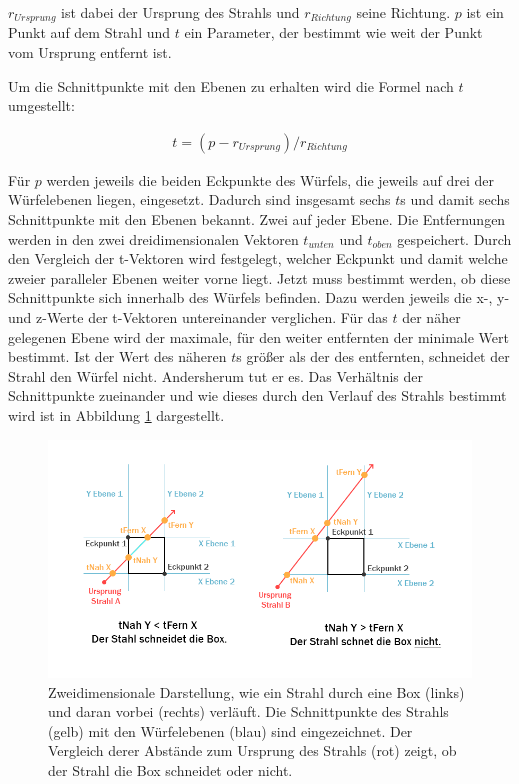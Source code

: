 $r_{Ursprung}$ ist dabei der Ursprung des Strahls und $r_{Richtung}$ seine Richtung. $p$ ist ein Punkt auf dem Strahl und $t$ ein Parameter, der bestimmt wie weit der Punkt vom Ursprung entfernt ist.

Um die Schnittpunkte mit den Ebenen zu erhalten wird die Formel nach $t$ umgestellt:

\begin{align}
t=(p-r_{Ursprung})/r_{Richtung}
\end{align}

Für $p$ werden jeweils die beiden Eckpunkte des Würfels, die jeweils auf drei der Würfelebenen liegen, eingesetzt.
Dadurch sind insgesamt sechs $t$s und damit sechs Schnittpunkte mit den Ebenen bekannt. Zwei auf jeder Ebene. Die Entfernungen werden in den zwei dreidimensionalen Vektoren $t_{unten}$ und $t_{oben}$ gespeichert. Durch den Vergleich der t-Vektoren wird festgelegt, welcher Eckpunkt und damit welche zweier paralleler Ebenen weiter vorne liegt. 
Jetzt muss bestimmt werden, ob diese Schnittpunkte sich innerhalb des Würfels befinden.
Dazu werden jeweils die x-, y- und z-Werte der t-Vektoren untereinander verglichen. Für das $t$ der näher gelegenen Ebene wird der maximale, für den weiter entfernten der minimale Wert bestimmt. Ist der Wert des näheren $t$s größer als der des entfernten, schneidet der Strahl den Würfel nicht. Andersherum tut er es.
Das Verhältnis der Schnittpunkte zueinander und wie dieses durch den Verlauf des Strahls bestimmt wird ist in Abbildung \ref{img:rayBoxHit} dargestellt.

\begin{figure}[!htb]
	\centering
	\includegraphics[width=0.9\linewidth]{images/rayBox.png}
	\caption{Zweidimensionale Darstellung, wie ein Strahl durch eine Box (links) und daran vorbei (rechts) verläuft. Die Schnittpunkte des Strahls (gelb) mit den Würfelebenen (blau) sind eingezeichnet. Der Vergleich derer Abstände zum Ursprung des Strahls (rot) zeigt, ob der Strahl die Box schneidet oder nicht.}
	\label{img:rayBoxHit}
\end{figure}
\FloatBarrier

